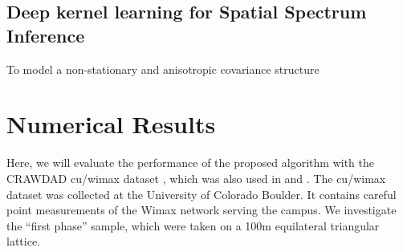 \documentclass[journal, oneside, twocolumn]{IEEEtran}
\begin{document}
\subsection{Deep kernel learning for Spatial Spectrum Inference}
To model a non-stationary and anisotropic covariance structure

\section{Numerical Results}
Here, we will evaluate the performance of the proposed algorithm with the CRAWDAD cu/wimax dataset \cite{Ton2012}, which was also used in \cite{Phillips2012} and \cite{Hu2020}. The cu/wimax dataset was collected at the University of Colorado Boulder. It contains careful point measurements of the Wimax network serving the campus. We investigate the ``first phase'' sample, which were taken on a 100m equilateral triangular lattice. 





\section{}
\subsection{}


\ifCLASSOPTIONcaptionsoff
\newpage
\fi






\end{document}
